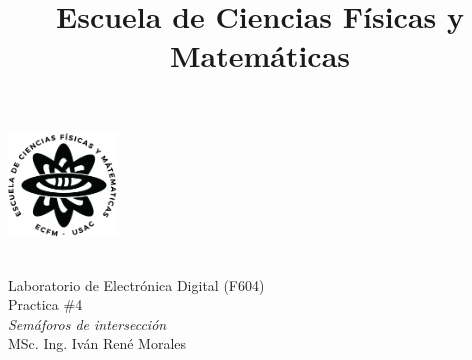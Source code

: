 \documentclass[11pt, letterpaper]{article} %
\title{Escuela de Ciencias Físicas y Matemáticas}
\makeatletter
\let\thetitle\@title
\newcommand{\hoofding}[5]{ %
\begin{flushleft}
\includegraphics[height=2.8cm]{images/logoecfm.png} %
\end{flushleft}
\vspace{-3cm} %
\hspace{4cm} 
\parbox{15cm}{ #1\\#2\\#3\\#4\\#5} %
{\parindent=0pt \hrulefill} 
\vspace{1mm}}
\makeatother
\begin{document}
\setlength{\parindent}{1cm}%

\hoofding {\thetitle}{Laboratorio de Electrónica Digital (F604)}{Practica $\#$4}
{\textit{Semáforos de intersección}}{MSc. Ing. Iván René Morales}%


%
%
\end{document}
